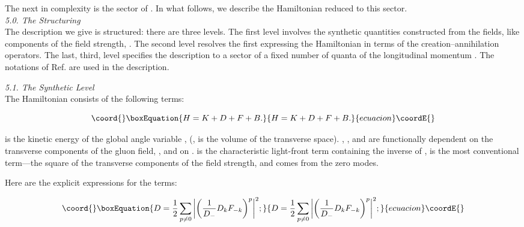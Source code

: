 \documentclass[a4paper,12pt]{article}
\begin{document}
The next in complexity is the sector of \coordHE{}. 
In what follows, we describe the Hamiltonian 
reduced to this sector.\\


{\it 5.0. The Structuring }\\

The description we give is structured: there are three levels.
The first level involves the synthetic quantities constructed from
the fields, like components of the field strength, \coordHE{}.   
The second level resolves the first expressing the Hamiltonian
in terms of the creation--annihilation operators. The last, third, level
specifies the description to a sector of a fixed number of quanta of the
longitudinal momentum \coordHE{}. The notations of 
Ref. \cite{KMPV} are used in the 
description.\\


\vspace{.3cm}

{\it 5.1. The Synthetic Level }\\

\vspace{.3cm}
The Hamiltonian consists of the following terms:

\begin{equation}\coord{}\boxEquation{
\label{terms}
H = K + D + F + B.
}{
H = K + D + F + B.
}{ecuacion}\coordE{}\end{equation}

\coordHE{} is the kinetic energy of the global angle variable \coordHE{}, 
\coordHE{}  \-
(\coordHE{}, 
\coordHE{} is the volume of the transverse space).
\coordHE{}, \coordHE{}, and \coordHE{} are functionally dependent on the transverse
components of the gluon field, \coordHE{}, and on \coordHE{}. \coordHE{} is the 
characteristic light-front term containing the inverse of \coordHE{}, 
\coordHE{} is the most conventional term---the square of the transverse 
components of the field strength, and \coordHE{} comes from the zero modes. 

Here are the explicit expressions for the terms:

\begin{equation}\coord{}\boxEquation{
\label{D}
 D = \frac{1}{2} \sum_{p \neq 0} 
\bigg| \bigg( \frac{1}{D_-}D_kF_{-k} \bigg)^p\bigg|^2;
}{
D = \frac{1}{2} \sum_{p \neq 0} 
\bigg| \bigg( \frac{1}{D_-}D_kF_{-k} \bigg)^p\bigg|^2;
}{ecuacion}\coordE{}\end{equation}
\end{document}
